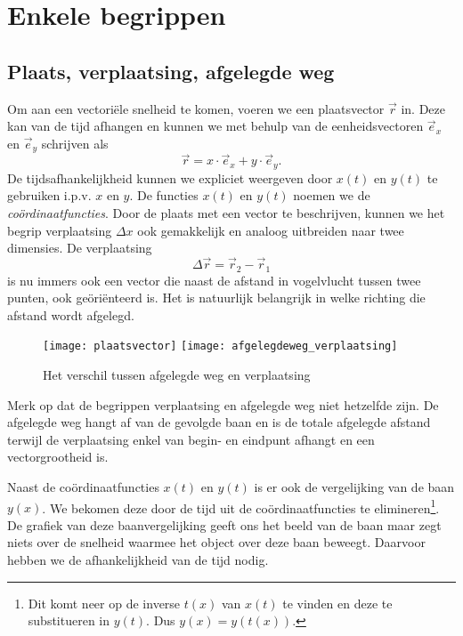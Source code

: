 \documentclass{ximera}
\begin{document}
	\author{Bart Lambregs}




	\section{Enkele begrippen}

	\subsection{Plaats, verplaatsing, afgelegde weg}
	
	Om aan een vectori\"ele snelheid te komen, voeren we een plaatsvector $\vec{r}$ in. Deze kan van de tijd afhangen en kunnen we met behulp van de eenheidsvectoren $\vec{e}_x$ en $\vec{e}_y$ schrijven als
	\begin{equation*}
	 \vec{r}=x\cdot\vec{e}_x+y\cdot\vec{e}_y.
	\end{equation*}
	De tijdsafhankelijkheid kunnen we expliciet weergeven door $x(t)$ en $y(t)$ te gebruiken i.p.v. $x$ en $y$. De functies $x(t)$ en $y(t)$ noemen we de \emph{co\"ordinaat\-functies}. Door de plaats met een vector te beschrijven, kunnen we het begrip verplaatsing $\Delta x$ ook gemakkelijk en analoog uitbreiden naar twee dimensies. De verplaatsing
	\begin{equation*}
	\Delta\vec{r}=\vec{r}_2-\vec{r}_1
	\end{equation*}
	is nu immers ook een vector die naast de afstand in vogelvlucht tussen twee punten, ook ge\"ori\"enteerd is. Het is natuurlijk belangrijk in welke richting die afstand wordt afgelegd.
	\begin{figure}[h]
	\centering
	\texttt{[image: plaatsvector]}
	\texttt{[image: afgelegdeweg\_verplaatsing]}
	\caption{Het verschil tussen afgelegde weg en verplaatsing}
	\end{figure}
	Merk op dat de begrippen verplaatsing en afgelegde weg niet hetzelfde zijn. De afgelegde weg hangt af van de gevolgde baan en is de totale afgelegde afstand terwijl de verplaatsing enkel van begin- en eindpunt afhangt en een vectorgrootheid is.
	
	Naast de co\"ordinaatfuncties $x(t)$ en $y(t)$ is er ook de vergelijking van de baan $y(x)$. We bekomen deze door de tijd uit de co\"ordinaatfuncties te elimineren\footnote{Dit komt neer op de inverse $t(x)$ van $x(t)$ te vinden en deze te substitueren in $y(t)$. Dus $y(x)=y(t(x))$.}. De grafiek van deze baanvergelijking geeft ons het beeld van de baan maar zegt niets over de snelheid waarmee het object over deze baan beweegt. Daarvoor hebben we de afhankelijkheid van de tijd nodig.
	
\end{document}

